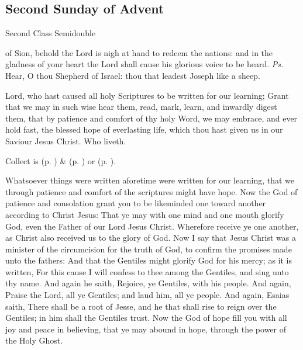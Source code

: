 \subsection{Second Sunday of Advent}
\begin{inhead}
{Second Class Semidouble}
\end{inhead}


\introit
{} of Sion, behold the Lord is nigh at hand to redeem the nations: and in the gladness of your heart the Lord shall cause his glorious voice to be heard. \textit{Ps.} Hear, O thou Shepherd of Israel: thou that leadest Joseph like a sheep.

\collect
{} Lord, who hast caused all holy Scriptures to be written for our learning; Grant that we may in such wise hear them, read, mark, learn, and inwardly digest them, that by patience and comfort of thy holy Word, we may embrace, and ever hold fast, the blessed hope of everlasting life, which thou hast given us in our Saviour Jesus Christ. Who liveth.
\begin{rubric}
     Collect is  (p. \pageref{SPMaryInAdvent}) \&   (p. \pageref{SPAgainst}) or  (p. \pageref{SPChiefBishop}).
\end{rubric}
 Whatsoever things were written aforetime were written for our learning, that we through patience and comfort of the scriptures might have hope. Now the God of patience and consolation grant you to be likeminded one toward another according to Christ Jesus: That ye may with one mind and one mouth glorify God, even the Father of our Lord Jesus Christ. Wherefore receive ye one another, as Christ also received us to the glory of God. Now I say that Jesus Christ was a minister of the circumcision for the truth of God, to confirm the promises made unto the fathers: And that the Gentiles might glorify God for his mercy; as it is written, For this cause I will confess to thee among the Gentiles, and sing unto thy name. And again he saith, Rejoice, ye Gentiles, with his people. And again, Praise the Lord, all ye Gentiles; and laud him, all ye people. And again, Esaias saith, There shall be a root of Jesse, and he that shall rise to reign over the Gentiles; in him shall the Gentiles trust. Now the God of hope fill you with all joy and peace in believing, that ye may abound in hope, through the power of the Holy Ghost.

